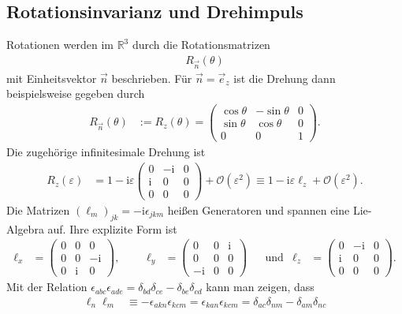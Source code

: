 \documentclass[english, parskip=full]{scrreport}
\newcommand{\tecxt}{}
\renewcommand{\i}{\text{i}}
\begin{document}
\subsection{Rotationsinvarianz und Drehimpuls}
Rotationen werden im $\mathbb{R}^3$ durch die Rotationsmatrizen
\begin{align}
R_{\vec{n}} (\theta) 
\end{align}
mit Einheitsvektor $\vec{n}$ beschrieben.
Für $\vec{n} = \vec{e}_z$ ist die Drehung dann beispielsweise gegeben durch
\begin{align}
R_{\vec{n}} (\theta) &:= R_z(\theta) = \begin{pmatrix}
\cos\theta & -\sin\theta & 0\\
\sin\theta & \cos\theta & 0\\
0 & 0 & 1
\end{pmatrix}.
\end{align}
Die zugehörige infinitesimale Drehung ist
\begin{align}
R_z(\varepsilon) &= 1 -\i\varepsilon\begin{pmatrix}
0 & -\i & 0 \\ \i & 0 & 0 \\ 0&0&0
\end{pmatrix} + \mathcal{O}(\varepsilon^2) \equiv 1 - \i\varepsilon\ell_z + \mathcal{O}(\varepsilon^2).
\end{align}
Die Matrizen $(\ell_m)_{jk} = -\i\epsilon_{jkm}$ heißen Generatoren und spannen eine Lie-Algebra auf.
Ihre explizite Form ist
\begin{align}
\ell_x &= \begin{pmatrix}
0 & 0 & 0 \\ 0 & 0 & -\i \\ 0&\i&0
\end{pmatrix}, &&& \ell_y &= \begin{pmatrix}
0 & 0 & \i \\ 0 & 0 & 0 \\ -\i&0&0
\end{pmatrix} &&\tecxt\text{und} & \ell_z &= \begin{pmatrix}
0 & -\i & 0 \\ \i & 0 & 0 \\ 0&0&0
\end{pmatrix}.
\end{align}
Mit der Relation $\epsilon_{abc}\epsilon_{ade} = \delta_{bd}\delta_{ce} - \delta_{be}\delta_{cd}$ kann man zeigen, dass
\begin{align}
 \ell_n\ell_m  &\equiv  -\epsilon_{akn}\epsilon_{kcm} = \epsilon_{kan}\epsilon_{kcm} = \delta_{ac}\delta_{nm} - \delta_{am}\delta_{nc}
\end{align}
\end{document}
